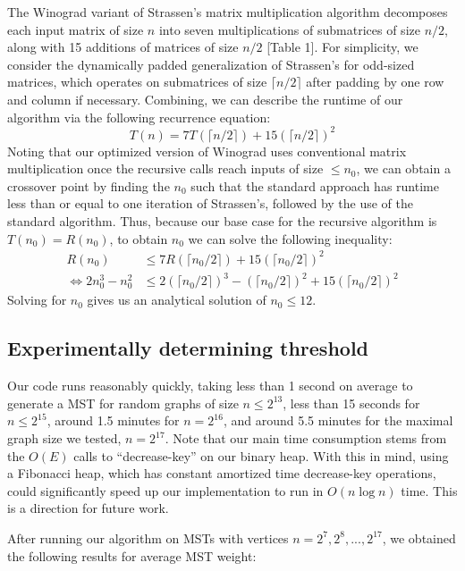 \documentclass[a4paper]{article}
\begin{document}
The Winograd variant of Strassen's matrix multiplication algorithm decomposes each input matrix of size $n$ into seven multiplications of submatrices of size $n/2$, along with 15 additions of matrices of size $n/2$ [Table 1]. For simplicity, we consider the dynamically padded generalization of Strassen's for odd-sized matrices, which operates on submatrices of size $\lceil n/2\rceil$ after padding by one row and column if necessary. Combining, we can describe the runtime of our algorithm via the following recurrence equation: 
$$T(n) = 7T(\lceil n/2\rceil) + 15(\lceil n/2\rceil)^2$$
Noting that our optimized version of Winograd uses conventional matrix multiplication once the recursive calls reach inputs of size $\leq n_0$, we can obtain a crossover point by finding the $n_0$ such that the standard approach has runtime less than or equal to one iteration of Strassen's, followed by the use of the standard algorithm. Thus, because our base case for the recursive algorithm is $T(n_0) = R(n_0)$, to obtain $n_0$ we can solve the following inequality:
\begin{align*}
R(n_0) &\leq 7R(\lceil n_0/2\rceil) + 15(\lceil n_0/2\rceil)^2 \\
\iff 2n_0^3-n_0^2 &\leq 2(\lceil n_0/2\rceil)^3 - (\lceil n_0/2\rceil)^2 + 15(\lceil n_0/2\rceil)^2
\end{align*}
Solving for $n_0$ gives us an analytical solution of $n_0 \leq 12$.


\subsection{Experimentally determining threshold}



Our code runs reasonably quickly, taking less than 1 second on average to generate a MST for random graphs of size $n\leq2^{13}$, less than 15 seconds for $n\leq 2^{15}$, around 1.5 minutes for $n=2^{16}$, and around 5.5 minutes for the maximal graph size we tested, $n=2^{17}$. Note that our main time consumption stems from the $O(E)$ calls to ``decrease-key'' on our binary heap. With this in mind, using a Fibonacci heap, which has constant amortized time decrease-key operations, could significantly speed up our implementation to run in $O(n\log n)$ time. This is a direction for future work.

\newpage
After running our algorithm on MSTs with vertices $n=2^7, 2^8, ..., 2^{17}$, we obtained the following results for average MST weight:
\end{document}
